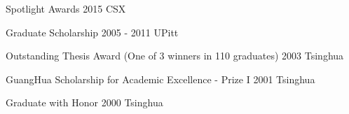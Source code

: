 
\begin{cvhonors}

\cvhonor
{Spotlight Awards} %
{} %
{2015} %
{CSX} %

\cvhonor
{Graduate Scholarship} %
{} %
{2005 - 2011} %
{UPitt} %

\cvhonor
{Outstanding Thesis Award (One of 3 winners in 110 graduates)} %
{} %
{2003} %
{Tsinghua} %

\cvhonor
{GuangHua Scholarship for Academic Excellence - Prize I} %
{} %
{2001} %
{Tsinghua} %

\cvhonor
{Graduate with Honor} %
{} %
{2000} %
{Tsinghua} %

\end{cvhonors}




